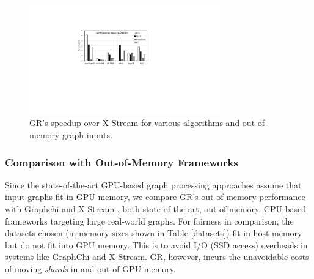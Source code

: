 \begin{figure}[!t]
\centering
\includegraphics[width=0.75\textwidth,height=0.75\textheight,keepaspectratio]{figures/speedup2.pdf}
\caption{GR's speedup over X-Stream for various algorithms and out-of-memory graph inputs. }
\label{fig:speedup2}
\end{figure}





\subsubsection{Comparison with Out-of-Memory Frameworks}


Since the state-of-the-art GPU-based graph processing approaches \cite{mapgraph,vertexapi,medusa,cusha} assume that input graphs fit 
in GPU memory, we compare GR's out-of-memory performance with Graphchi \cite{chi} and X-Stream \cite{xstream}, both state-of-the-art, 
out-of-memory, CPU-based frameworks targeting large real-world graphs. For fairness in comparison, the datasets chosen (in-memory sizes 
shown in Table \ref{datasets}) fit in host memory but do not fit into GPU memory. This is to avoid I/O (SSD access) overheads in
systems like GraphChi and X-Stream. GR, however, incurs the unavoidable costs of moving \textit{shards} in and out of GPU memory.


